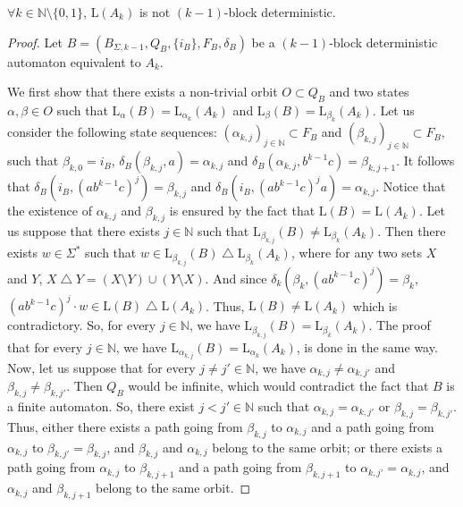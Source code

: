 \documentclass{llncs}
\begin{document}
\begin{proposition}
	$\forall k \in \mathbb{N} \setminus \{0, 1\}$, $\mathrm{L}(A_k)$ is not $(k-1)$-block deterministic.
\end{proposition}
\begin{proof}
	Let $B = (B_{\Sigma, k-1}, Q_B, \{i_B\}, F_B, \delta_B)$ be a $(k-1)$-block deterministic automaton equivalent to $A_k$.
	
	We first show that there exists a non-trivial orbit $O \subset Q_B$ and two states $\alpha, \beta \in O$ such that $\mathrm{L}_{\alpha}(B) = \mathrm{L}_{\alpha_k}(A_k)$ and $\mathrm{L}_{\beta}(B) = \mathrm{L}_{\beta_k}(A_k)$.
	Let us consider the following state sequences: $(\alpha_{k, j})_{j \in \mathbb{N}} \subset F_B$ and $(\beta_{k, j})_{j \in \mathbb{N}} \subset F_B$, such that $\beta_{k, 0} = i_B$, $\delta_B(\beta_{k, j}, a) = \alpha_{k, j}$ and $\delta_B(\alpha_{k, j}, b^{k-1}c) = \beta_{k, j+1}$.
	It follows that $\delta_B(i_B, (ab^{k-1}c)^j) = \beta_{k, j}$ and $\delta_B(i_B, (ab^{k-1}c)^{j}a) = \alpha_{k, j}$.
	Notice that the existence of $\alpha_{k, j}$ and $\beta_{k, j}$ is ensured by the fact that $\mathrm{L}(B) = \mathrm{L}(A_k)$.
	Let us suppose that there exists $j \in \mathbb{N}$ such that $\mathrm{L}_{\beta_{k, j}}(B) \neq \mathrm{L}_{\beta_k}(A_k)$.
	Then there exists $w \in \Sigma^*$ such that $w \in \mathrm{L}_{\beta_{k, j}}(B) \bigtriangleup \mathrm{L}_{\beta_k}(A_k)$, where for any two sets $X$ and $Y$, $X\bigtriangleup Y=(X\setminus Y) \cup (Y\setminus X)$.
	And since $\delta_k(\beta_k, (ab^{k-1}c)^j) = \beta_k$, $(ab^{k-1}c)^j \cdot w \in \mathrm{L}(B) \bigtriangleup \mathrm{L}(A_k)$.
	Thus, $\mathrm{L}(B) \neq \mathrm{L}(A_k)$ which is contradictory.
	So, for every $j \in \mathbb{N}$, we have $\mathrm{L}_{\beta_{k, j}}(B) = \mathrm{L}_{\beta_k}(A_k)$.
	The proof that for every $j \in \mathbb{N}$, we have $\mathrm{L}_{\alpha_{k, j}}(B) = \mathrm{L}_{\alpha_k}(A_k)$, is done in the same way.
	Now, let us suppose that for every $j \neq j' \in \mathbb{N}$, we have $\alpha_{k, j} \neq \alpha_{k, j'}$ and $\beta_{k, j} \neq \beta_{k, j'}$.
	Then $Q_B$ would be infinite, which would contradict the fact that $B$ is a finite automaton.
	So, there exist $j < j' \in \mathbb{N}$ such that $\alpha_{k, j} = \alpha_{k, j'}$ or $\beta_{k, j} = \beta_{k, j'}$.
	Thus, either there exists a path going from $\beta_{k, j}$ to $\alpha_{k, j}$ and a path going from $\alpha_{k, j}$ to $\beta_{k, j'} = \beta_{k, j}$, and $\beta_{k, j}$ and $\alpha_{k, j}$ belong to the same orbit; or there exists a path going from $\alpha_{k, j}$ to $\beta_{k, j + 1}$ and a path going from $\beta_{k, j + 1}$ to $\alpha_{k, j'} = \alpha_{k, j}$, and $\alpha_{k, j}$ and $\beta_{k, j + 1}$ belong to the same orbit.
	

\end{proof}
\end{document}
